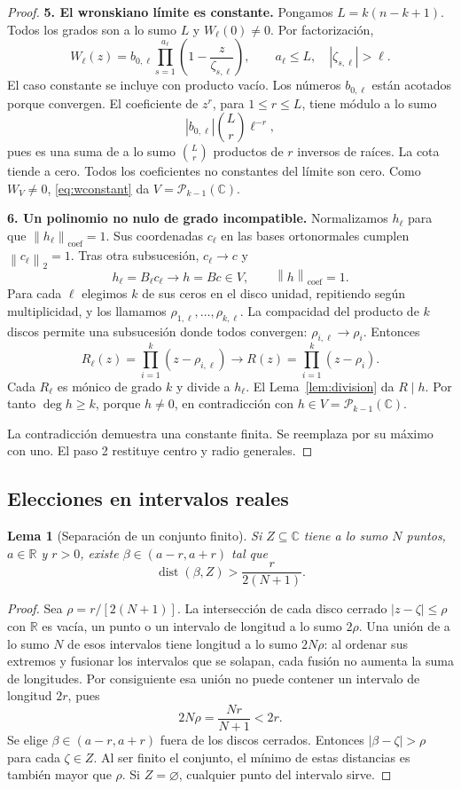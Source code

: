 \documentclass[11pt,a4paper]{article}
\numberwithin{equation}{section}
\newtheorem{lemma}[theorem]{Lema}
\theoremstyle{definition}
\theoremstyle{remark}
\newcommand{\R}{\mathbb R}
\newcommand{\C}{\mathbb C}
\newcommand{\PP}{\mathcal P}
\newcommand{\norm}[1]{\left\lVert#1\right\rVert}
\DeclareMathOperator{\dist}{dist}
\newcommand{\paso}[1]{\par\smallskip\noindent\textbf{#1}\quad}
\begin{document}
\begin{proof}
\paso{5. El wronskiano límite es constante.}
Pongamos $L=k(n-k+1)$. Todos los grados son a lo sumo $L$ y $W_\ell(0)\ne0$. Por factorización,
\[
W_\ell(z)=b_{0,\ell}\prod_{s=1}^{a_\ell}\left(1-\frac z{\zeta_{s,\ell}}\right),
\qquad a_\ell\le L,\quad |\zeta_{s,\ell}|>\ell.
\]
El caso constante se incluye con producto vacío. Los números $b_{0,\ell}$ están acotados porque convergen. El coeficiente de $z^r$, para $1\le r\le L$, tiene módulo a lo sumo
\[
|b_{0,\ell}|\binom Lr\ell^{-r},
\]
pues es una suma de a lo sumo $\binom Lr$ productos de $r$ inversos de raíces. La cota tiende a cero. Todos los coeficientes no constantes del límite son cero. Como $W_V\ne0$, \eqref{eq:wconstant} da $V=\PP_{k-1}(\C)$.

\paso{6. Un polinomio no nulo de grado incompatible.}
Normalizamos $h_\ell$ para que $\norm{h_\ell}_{\mathrm{coef}}=1$. Sus coordenadas $c_\ell$ en las bases ortonormales cumplen $\norm{c_\ell}_2=1$. Tras otra subsucesión, $c_\ell\to c$ y
\[
h_\ell=B_\ell c_\ell\longrightarrow h=Bc\in V,\qquad \norm h_{\mathrm{coef}}=1.
\]
Para cada $\ell$ elegimos $k$ de sus ceros en el disco unidad, repitiendo según multiplicidad, y los llamamos $\rho_{1,\ell},\ldots,\rho_{k,\ell}$. La compacidad del producto de $k$ discos permite una subsucesión donde todos convergen: $\rho_{i,\ell}\to\rho_i$. Entonces
\[
R_\ell(z)=\prod_{i=1}^k(z-\rho_{i,\ell})\longrightarrow
R(z)=\prod_{i=1}^k(z-\rho_i).
\]
Cada $R_\ell$ es mónico de grado $k$ y divide a $h_\ell$. El Lema~\ref{lem:division} da $R\mid h$. Por tanto $\deg h\ge k$, porque $h\ne0$, en contradicción con $h\in V=\PP_{k-1}(\C)$.

La contradicción demuestra una constante finita. Se reemplaza por su máximo con uno. El paso 2 restituye centro y radio generales.
\end{proof}

\subsection{Elecciones en intervalos reales}
\begin{lemma}[Separación de un conjunto finito]\label{lem:finite}
Si $Z\subseteq\C$ tiene a lo sumo $N$ puntos, $a\in\R$ y $r>0$, existe $\beta\in(a-r,a+r)$ tal que
\[
\dist(\beta,Z)>\frac{r}{2(N+1)}.
\]
\end{lemma}
\begin{proof}
Sea $\rho=r/[2(N+1)]$. La intersección de cada disco cerrado $|z-\zeta|\le\rho$ con $\R$ es vacía, un punto o un intervalo de longitud a lo sumo $2\rho$. Una unión de a lo sumo $N$ de esos intervalos tiene longitud a lo sumo $2N\rho$: al ordenar sus extremos y fusionar los intervalos que se solapan, cada fusión no aumenta la suma de longitudes. Por consiguiente esa unión no puede contener un intervalo de longitud $2r$, pues
\[
2N\rho=\frac{Nr}{N+1}<2r.
\]
Se elige $\beta\in(a-r,a+r)$ fuera de los discos cerrados. Entonces $|\beta-\zeta|>\rho$ para cada $\zeta\in Z$. Al ser finito el conjunto, el mínimo de estas distancias es también mayor que $\rho$. Si $Z=\varnothing$, cualquier punto del intervalo sirve.
\end{proof}
\end{document}
